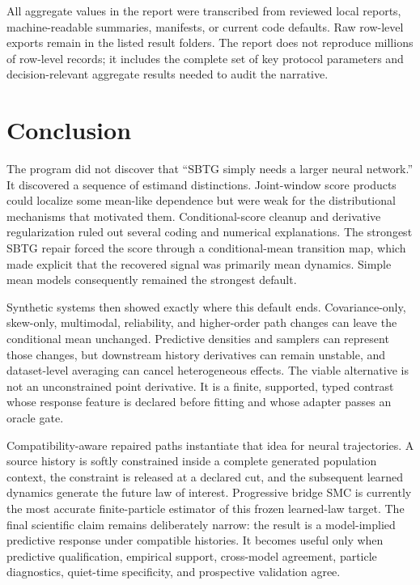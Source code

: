 \documentclass[10pt]{article}
\begin{document}
All aggregate values in the report were transcribed from reviewed local reports, machine-readable summaries, manifests, or current code defaults. Raw row-level exports remain in the listed result folders. The report does not reproduce millions of row-level records; it includes the complete set of key protocol parameters and decision-relevant aggregate results needed to audit the narrative.

\section{Conclusion}

The program did not discover that ``SBTG simply needs a larger neural network.'' It discovered a sequence of estimand distinctions. Joint-window score products could localize some mean-like dependence but were weak for the distributional mechanisms that motivated them. Conditional-score cleanup and derivative regularization ruled out several coding and numerical explanations. The strongest SBTG repair forced the score through a conditional-mean transition map, which made explicit that the recovered signal was primarily mean dynamics. Simple mean models consequently remained the strongest default.

Synthetic systems then showed exactly where this default ends. Covariance-only, skew-only, multimodal, reliability, and higher-order path changes can leave the conditional mean unchanged. Predictive densities and samplers can represent those changes, but downstream history derivatives can remain unstable, and dataset-level averaging can cancel heterogeneous effects. The viable alternative is not an unconstrained point derivative. It is a finite, supported, typed contrast whose response feature is declared before fitting and whose adapter passes an oracle gate.

Compatibility-aware repaired paths instantiate that idea for neural trajectories. A source history is softly constrained inside a complete generated population context, the constraint is released at a declared cut, and the subsequent learned dynamics generate the future law of interest. Progressive bridge SMC is currently the most accurate finite-particle estimator of this frozen learned-law target. The final scientific claim remains deliberately narrow: the result is a model-implied predictive response under compatible histories. It becomes useful only when predictive qualification, empirical support, cross-model agreement, particle diagnostics, quiet-time specificity, and prospective validation agree.
\end{document}
